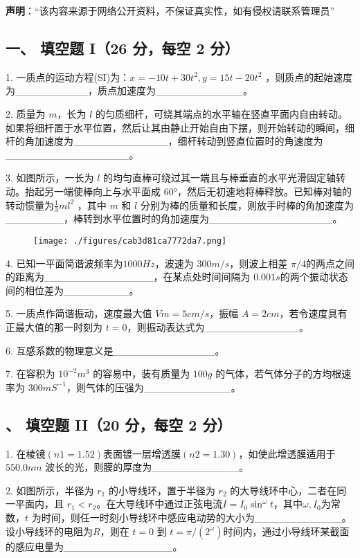 
\textbf{声明}：“该内容来源于网络公开资料，不保证真实性，如有侵权请联系管理员”

\subsection{一、 填空题 I（26 分，每空 2 分）}
1. 一质点的运动方程(SI)为：$x=-10t+30t^2,y=15t-20t^2$ ，则质点的起始速度为__________，质点加速度为____________。

2. 质量为 $m$，长为 $l$ 的匀质细杆，可绕其端点的水平轴在竖直平面内自由转动。如果将细杆置于水平位置，然后让其由静止开始自由下摆，则开始转动的瞬间，细杆的角加速度为_____________，细杆转动到竖直位置时的角速度为_________________。

3. 如图所示，一长为 $l$ 的均匀直棒可绕过其一端且与棒垂直的水平光滑固定轴转动。抬起另一端使棒向上与水平面成 60°，然后无初速地将棒释放。已知棒对轴的转动惯量为$\frac{1}{3}ml^2$ ，其中 $m$ 和 $l$ 分别为棒的质量和长度，则放手时棒的角加速度为________，棒转到水平位置时的角加速度为_________________。
\begin{figure}[ht]
\centering
\texttt{[image: ./figures/cab3d81ca7772da7.png]}
\caption{} \label{fig_NJUD3_1}
\end{figure}
4. 已知一平面简谐波频率为$1000Hz$，波速为 $300m/s$，则波上相差 $\pi/4$的两点之间的距离为_______________，在某点处时间间隔为 $0.001s$的两个振动状态间的相位差为_________。

5. 一质点作简谐振动，速度最大值 $Vm=5cm/s$，振幅 $A=2cm$，若令速度具有正最大值的那一时刻为 $t=0$，则振动表达式为_____________。

6. 互感系数的物理意义是______________。

7. 在容积为 $10^{-2}m^3$ 的容易中，装有质量为 $100g$ 的气体，若气体分子的方均根速率为 $300mS^{-1}$，则气体的压强为____________。
\subsection{、 填空题 II（20 分，每空 2 分）}
1. 在棱镜$(n1=1.52)$表面镀一层增透膜$(n2=1.30)$，如使此增透膜适用于 $550.0nm$ 波长的光，则膜的厚度为____________。

2. 如图所示，半径为 $r_1$ 的小导线环，置于半径为 $r_2$ 的大导线环中心，二者在同一平面内，且 $r_1<r_2$。在大导线环中通过正弦电流$I=I_0\sin^\omega t$，其中$\omega ,I_0$为常数，$t$ 为时间，则任一时刻小导线环中感应电动势的大小为____________。设小导线环的电阻为$R$，则在 $t=0$ 到 $t=\pi/(2^\omega )$时间内，通过小导线环某截面的感应电量为_______________。

